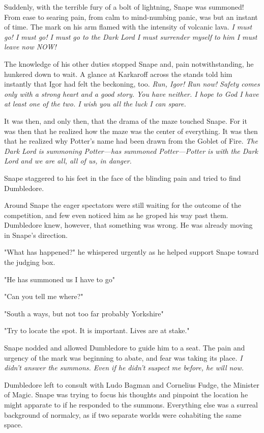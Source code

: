 Suddenly, with the terrible fury of a bolt of lightning, Snape was summoned! From ease to searing pain, from calm to mind-numbing panic, was but an instant of time. The mark on his arm flamed with the intensity of volcanic lava. \emph{I must go! I must go! I must go to the Dark Lord{\el} I must surrender myself to him{\el} I must leave{\el} now{\el} NOW!}

The knowledge of his other duties stopped Snape and, pain notwithstanding, he hunkered down to wait. A glance at Karkaroff across the stands told him instantly that Igor had felt the beckoning, too. \emph{Run, Igor! Run now! Safety comes only with a strong heart and a good story. You have neither. I hope to God I have at least one of the two. I wish you all the luck I can spare.}

It was then, and only then, that the drama of the maze touched Snape. For it was then that he realized how the maze was the center of everything. It was then that he realized why Potter's name had been drawn from the Goblet of Fire. \emph{The Dark Lord is summoning Potter—has summoned Potter—Potter is with the Dark Lord and we are all, all of us, in danger.}

Snape staggered to his feet in the face of the blinding pain and tried to find Dumbledore.

Around Snape the eager spectators were still waiting for the outcome of the competition, and few even noticed him as he groped his way past them. Dumbledore knew, however, that something was wrong. He was already moving in Snape's direction.

"What has happened?" he whispered urgently as he helped support Snape toward the judging box.

"He has{\el} summoned{\el} us{\el} I{\el} have to{\el} go{\el}"

"Can you tell me where?"

"South{\el} a ways, but{\el} not too far{\el} probably{\el} Yorkshire{\el}"

"Try to locate the spot. It is important. Lives are at stake."

Snape nodded and allowed Dumbledore to guide him to a seat. The pain and urgency of the mark was beginning to abate, and fear was taking its place. \emph{I didn't answer the summons. Even if he didn't suspect me before, he will now.}

Dumbledore left to consult with Ludo Bagman and Cornelius Fudge, the Minister of Magic. Snape was trying to focus his thoughts and pinpoint the location he might apparate to if he responded to the summons. Everything else was a surreal background of normalcy, as if two separate worlds were cohabiting the same space.

